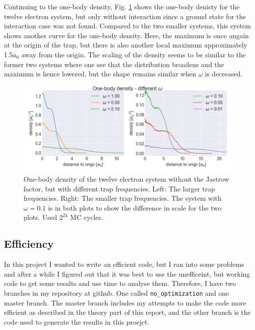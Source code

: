 Continuing to the one-body density, Fig. \ref{fig:one_body_density_no_interaction_12p} shows the one-body denisty for the twelve electron system, but only without interaction since a ground state for the interaction case was not found. Compared to the two smaller systems, this system shows another curve for the one-body density. Here, the maximum is once angain at the origin of the trap, but there is also another local maximum approximately 1.5$a_0$ away from the origin. The scaling of the density seems to be similar to the former two systems where one see that the distribution broadens and the maximum is hence lowered, but the shape remains similar when $\omega$ is decreased.

\begin{figure}[H]
\center
\includegraphics[width=0.85\linewidth]{../Results/one_body_density_no_interaction_12p}\caption{One-body density of the twelve electron system without the Jastrow factor, but with different trap frequencies. Left: The larger trap frequencies. Right: The smaller trap frequencies. The system with $\omega = 0.1$ is in both plots to show the difference in scale for the two plots. Used $2^{24}$ MC cycles. }\label{fig:one_body_density_no_interaction_12p}
\end{figure}

\subsection{Efficiency}

In this project I wanted to write an efficient code, but I ran into some problems and after a while I figured out that it was best to use the unefficeint, but working code to get some results and use time to analyse them. Therefore, I have two branches in my repository at github. One called \texttt{no\_optimization} and one master branch. The master branch includes my attempts to make the code more efficient as described in the theory part of this report, and the other branch is the code used to generate the results in this proejct.

